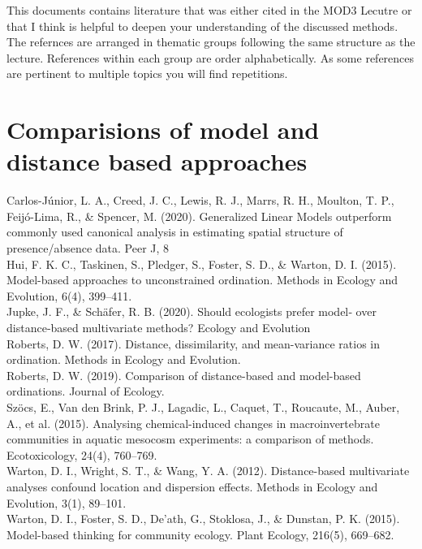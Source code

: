 \documentclass{article}
\begin{document}
This documents contains literature that was either cited in the MOD3 Lecutre or that I think is helpful to deepen your understanding of the discussed methods. The refernces are arranged in thematic groups following the same structure as the lecture. References within each group are order alphabetically. As some references are pertinent to multiple topics you will find repetitions. 
\section{Comparisions of model and distance based approaches}
Carlos-Júnior, L. A., Creed, J. C., Lewis, R. J., Marrs, R. H., Moulton, T. P., Feijó-Lima, R., \& Spencer, M. (2020). Generalized Linear Models outperform commonly used canonical analysis in estimating spatial structure of presence/absence data. Peer J, 8 \\

Hui, F. K. C., Taskinen, S., Pledger, S., Foster, S. D., \& Warton, D. I. (2015). Model-based approaches to unconstrained ordination. Methods in Ecology and Evolution, 6(4), 399–411. \\
Jupke, J. F., \& Schäfer, R. B. (2020). Should ecologists prefer model‐ over distance‐based multivariate methods? Ecology and Evolution\\

Roberts, D. W. (2017). Distance, dissimilarity, and mean-variance ratios in ordination. Methods in Ecology and Evolution. \\

Roberts, D. W. (2019). Comparison of distance-based and model-based ordinations. Journal of Ecology. \\

Szöcs, E., Van den Brink, P. J., Lagadic, L., Caquet, T., Roucaute, M., Auber, A., et al. (2015). Analysing chemical-induced changes in macroinvertebrate communities in aquatic mesocosm experiments: a comparison of methods. Ecotoxicology, 24(4), 760–769.\\ 

Warton, D. I., Wright, S. T., \& Wang, Y. A. (2012). Distance-based multivariate analyses confound location and dispersion effects. Methods in Ecology and Evolution, 3(1), 89–101.  \\

Warton, D. I., Foster, S. D., De’ath, G., Stoklosa, J., \& Dunstan, P. K. (2015). Model-based thinking for community ecology. Plant Ecology, 216(5), 669–682. \\
\end{document}
